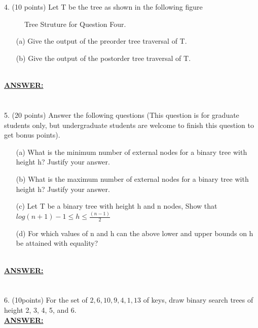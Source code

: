 \documentclass{article}
\newcommand{\answer}{\textbf{\\\underline{ANSWER:}\\}}
\begin{document}
\section*{}
4. (10 points) Let T be the tree as shown in the following figure
\begin{figure}[htb]
  \begin{center}
    \caption{Tree Struture for Question Four.}
  \end{center}
\end{figure}
\begin{enumerate}
\item[(a)]Give the output of the preorder tree traversal of T.
\item[(b)]Give the output of the postorder tree traversal of T.
\end{enumerate}
\answer

\section*{}
5. (20 points) Answer the following questions (This question is for
graduate students only, but undergraduate students are welcome to
finish this question to get bonus points). 
\begin{enumerate}
\item[(a)]What is the minimum number of external nodes for a binary tree with
height h? Justify your answer. 
\item[(b)]What is the maximum number of external nodes for a binary tree with
height h? Justify your answer.  
\item[(c)]Let T be a binary tree with height h and n nodes, Show that
$log(n+1)-1 \leq h \leq \frac{(n-1)}{2}$
\item[(d)]For which values of n and h can the above lower and upper bounds on
h be attained with equality? 
\end{enumerate}
\answer

\section*{}
6. (10points) For the set of ${ 2, 6, 10, 9, 4, 1, 13}$ of keys, draw
binary search trees of height 2, 3, 4, 5, and 6.
\answer   
\end{document}

